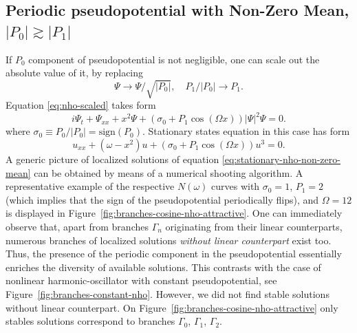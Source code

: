 \subsection{Periodic pseudopotential with Non-Zero Mean, $|P_0| \gtrsim |P_1|$}

If $P_0$ component of pseudopotential is not negligible, one can scale out the absolute value of it, by replacing 
\begin{equation}
	\Psi \to \Psi / \sqrt{|P_0|}, \quad P_1 / |P_0| \to P_1.
\end{equation}
Equation \eqref{eq:nho-scaled} takes form
\begin{equation}
	i \Psi_t + \Psi_{xx} + x^2 \Psi + (\sigma_0 + P_1 \cos (\Omega x)) |\Psi|^2 \Psi = 0.
\label{eq:nho-non-zero-mean}
\end{equation}
where $\sigma_0 \equiv P_0 / |P_0| = \mathrm{sign} (P_0)$.
Stationary states equation in this case has form
\begin{equation}
	u_{xx} + (\omega - x^2) u + (\sigma_0 + P_1 \cos (\Omega x)) u^3 = 0.
\label{eq:stationary-nho-non-zero-mean}
\end{equation}
A generic picture of localized solutions of equation \eqref{eq:stationary-nho-non-zero-mean} can be obtained by means of a numerical shooting algorithm.
A representative example of the respective $N(\omega)$ curves with $\sigma_0 = 1$, $P_1 = 2$ (which implies that the sign of the pseudopotential periodically flips), and $\Omega = 12$ is displayed in Figure~\ref{fig:branches-cosine-nho-attractive}.
One can immediately observe that, apart from branches $\Gamma_n$ originating from their linear counterparts, numerous branches of localized solutions {\it without linear counterpart} exist too.
Thus, the presence of the periodic component in the pseudopotential essentially enriches the diversity of available solutions.
This contrasts with the case of nonlinear harmonic-oscillator with constant pseudopotential, see Figure~\ref{fig:branches-constant-nho}.
However, we did not find stable solutions without linear counterpart.
On Figure~\ref{fig:branches-cosine-nho-attractive} only stables solutions correspond to branches $\Gamma_0$, $\Gamma_1$, $\Gamma_2$.

